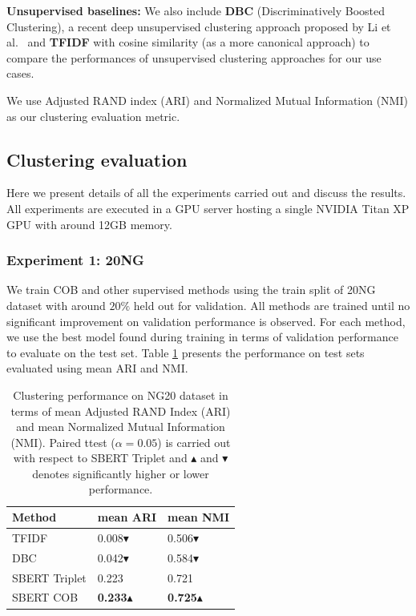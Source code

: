 \documentclass[11pt,a4paper]{article}
\begin{document}
\textbf{Unsupervised baselines:} We also include \textbf{DBC} (Discriminatively Boosted Clustering), a recent deep unsupervised clustering approach proposed by Li et al.~\cite{li2018discriminatively} and \textbf{TFIDF} with cosine similarity (as a more canonical approach) to compare the performances of unsupervised clustering approaches for our use cases.

We use Adjusted RAND index (ARI) and Normalized Mutual Information (NMI) as our clustering evaluation metric.

\subsection{Clustering evaluation} Here we present details of all the experiments carried out and discuss the results. All experiments are executed in a GPU server hosting a single NVIDIA Titan XP GPU with around 12GB memory.

\subsubsection{Experiment 1: 20NG} We train COB and other supervised methods using the train split of 20NG dataset with around $20\%$ held out for validation. All methods are trained until no significant improvement on validation performance is observed. For each method, we use the best model found during training in terms of validation performance to evaluate on the test set. Table \ref{tab:ng20exp} presents the performance on test sets evaluated using mean ARI and NMI.

\begin{table}[h]
\caption{Clustering performance on NG20 dataset in terms of mean Adjusted RAND Index (ARI) and mean Normalized Mutual Information (NMI). Paired ttest ($\alpha=0.05$) is carried out with respect to SBERT Triplet and $\blacktriangle$ and $\blacktriangledown$ denotes significantly higher or lower performance.}
\label{tab:ng20exp}
\begin{tabular}{lll}
\hline
Method        & mean ARI & mean NMI \\ \hline
TFIDF         & 0.008$\blacktriangledown$ & 0.506$\blacktriangledown$ \\
DBC           & 0.042$\blacktriangledown$ & 0.584$\blacktriangledown$ \\
SBERT Triplet & 0.223 & 0.721 \\
SBERT COB     & \textbf{0.233}$\blacktriangle$ & \textbf{0.725}$\blacktriangle$        
\end{tabular}
\end{table}
\end{document}
